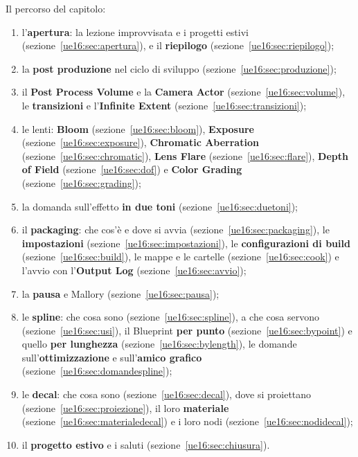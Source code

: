 Il percorso del capitolo:
\begin{enumerate}
  \item l'\textbf{apertura}: la lezione improvvisata e i progetti estivi
        (sezione~\ref{ue16:sec:apertura}), e il \textbf{riepilogo}
        (sezione~\ref{ue16:sec:riepilogo});
  \item la \textbf{post produzione} nel ciclo di sviluppo
        (sezione~\ref{ue16:sec:produzione});
  \item il \textbf{Post Process Volume} e la \textbf{Camera Actor}
        (sezione~\ref{ue16:sec:volume}), le \textbf{transizioni} e l'\textbf{Infinite
        Extent} (sezione~\ref{ue16:sec:transizioni});
  \item le lenti: \textbf{Bloom} (sezione~\ref{ue16:sec:bloom}), \textbf{Exposure}
        (sezione~\ref{ue16:sec:exposure}), \textbf{Chromatic Aberration}
        (sezione~\ref{ue16:sec:chromatic}), \textbf{Lens Flare}
        (sezione~\ref{ue16:sec:flare}), \textbf{Depth of Field}
        (sezione~\ref{ue16:sec:dof}) e \textbf{Color Grading}
        (sezione~\ref{ue16:sec:grading});
  \item la domanda sull'effetto \textbf{in due toni} (sezione~\ref{ue16:sec:duetoni});
  \item il \textbf{packaging}: che cos'è e dove si avvia (sezione~\ref{ue16:sec:packaging}),
        le \textbf{impostazioni} (sezione~\ref{ue16:sec:impostazioni}), le
        \textbf{configurazioni di build} (sezione~\ref{ue16:sec:build}), le mappe e le
        cartelle (sezione~\ref{ue16:sec:cook}) e l'avvio con l'\textbf{Output Log}
        (sezione~\ref{ue16:sec:avvio});
  \item la \textbf{pausa} e Mallory (sezione~\ref{ue16:sec:pausa});
  \item le \textbf{spline}: che cosa sono (sezione~\ref{ue16:sec:spline}), a che cosa
        servono (sezione~\ref{ue16:sec:usi}), il Blueprint \textbf{per punto}
        (sezione~\ref{ue16:sec:bypoint}) e quello \textbf{per lunghezza}
        (sezione~\ref{ue16:sec:bylength}), le domande sull'\textbf{ottimizzazione} e
        sull'\textbf{amico grafico} (sezione~\ref{ue16:sec:domandespline});
  \item le \textbf{decal}: che cosa sono (sezione~\ref{ue16:sec:decal}), dove si
        proiettano (sezione~\ref{ue16:sec:proiezione}), il loro \textbf{materiale}
        (sezione~\ref{ue16:sec:materialedecal}) e i loro nodi
        (sezione~\ref{ue16:sec:nodidecal});
  \item il \textbf{progetto estivo} e i saluti (sezione~\ref{ue16:sec:chiusura}).
\end{enumerate}

